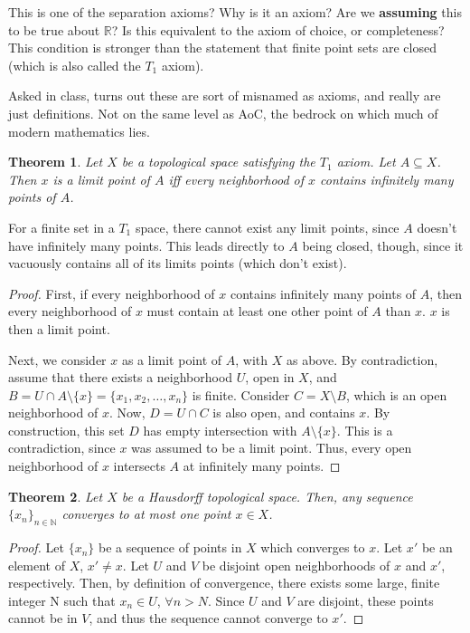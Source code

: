 \documentclass[11pt]{article}
\newtheorem{theorem}{Theorem}[section]
\begin{document}
This is one of the separation axioms? Why is it an axiom? Are we
\textbf{assuming} this to be true about \(\mathbb{R}\)? Is this
equivalent to the axiom of choice, or completeness? This condition is
stronger than the statement that finite point sets are closed (which
is also called the \(T_1\) axiom). 

Asked in class, turns out these are sort of misnamed as axioms, and
really are just definitions. Not on the same level as AoC, the bedrock
on which much of modern mathematics lies. 

\begin{theorem}
Let \(X\) be a topological space satisfying the \(T_1\) axiom. Let
\(A\subseteq X\). Then \(x\) is a limit point of \(A\) iff every
neighborhood of \(x\) contains infinitely many points of \(A\).
\end{theorem}

For a finite set in a \(T_1\) space, there cannot exist any limit
points, since \(A\) doesn't have infinitely many points. This leads
directly to \(A\) being closed, though, since it vacuously contains all
of its limits points (which don't exist).

\begin{proof}
First, if every neighborhood of \(x\) contains infinitely many points of
\(A\), then every neighborhood of \(x\) must contain at least one other
point of \(A\) than \(x\). \(x\) is then a limit point. 

Next, we consider \(x\) as a limit point of \(A\), with \(X\) as above. By
contradiction, assume that there exists a neighborhood \(U\), open in
\(X\), and \(B = U\cap A\setminus \{x\} = \{x_1, x_2,\ldots,x_n \}\) is
finite. Consider \(C = X\setminus B\), which is an open neighborhood of
\(x\). Now, \(D = U\cap C\) is also open, and contains \(x\). By
construction, this set \(D\) has empty intersection with \(A\setminus
\{x\}\). This is a contradiction, since \(x\) was assumed to be a limit
point. Thus, every open neighborhood of \(x\) intersects \(A\) at
infinitely many points.
\end{proof}

\begin{theorem}
Let \(X\) be a Hausdorff topological space. Then, any sequence
\(\{x_n\}_{n\in\mathbb{N}}\) converges to at most one point \(x \in X\).
\end{theorem}

\begin{proof}
Let \(\{x_n\}\) be a sequence of points in \(X\) which converges to
\(x\). Let \(x'\) be an element of \(X\), \(x' \not= x\). Let \(U\) and \(V\) be
disjoint open neighborhoods of \(x\) and \(x'\), respectively. Then, by
definition of convergence, there exists some large, finite integer N
such that \(x_n \in U\), \(\forall n > N\). Since \(U\) and \(V\) are
disjoint, these points cannot be in \(V\), and thus the sequence cannot
converge to \(x'\).
\end{proof}
\end{document}
